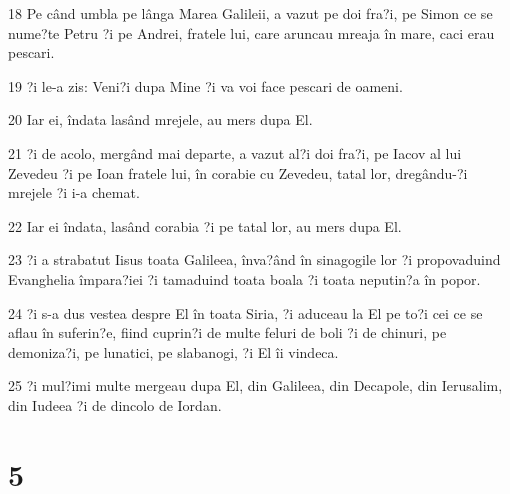 \par 18 Pe când umbla pe lânga Marea Galileii, a vazut pe doi fra?i, pe Simon ce se nume?te Petru ?i pe Andrei, fratele lui, care aruncau mreaja în mare, caci erau pescari.
\par 19 ?i le-a zis: Veni?i dupa Mine ?i va voi face pescari de oameni.
\par 20 Iar ei, îndata lasând mrejele, au mers dupa El.
\par 21 ?i de acolo, mergând mai departe, a vazut al?i doi fra?i, pe Iacov al lui Zevedeu ?i pe Ioan fratele lui, în corabie cu Zevedeu, tatal lor, dregându-?i mrejele ?i i-a chemat.
\par 22 Iar ei îndata, lasând corabia ?i pe tatal lor, au mers dupa El.
\par 23 ?i a strabatut Iisus toata Galileea, înva?ând în sinagogile lor ?i propovaduind Evanghelia împara?iei ?i tamaduind toata boala ?i toata neputin?a în popor.
\par 24 ?i s-a dus vestea despre El în toata Siria, ?i aduceau la El pe to?i cei ce se aflau în suferin?e, fiind cuprin?i de multe feluri de boli ?i de chinuri, pe demoniza?i, pe lunatici, pe slabanogi, ?i El îi vindeca.
\par 25 ?i mul?imi multe mergeau dupa El, din Galileea, din Decapole, din Ierusalim, din Iudeea ?i de dincolo de Iordan.

\chapter{5}

